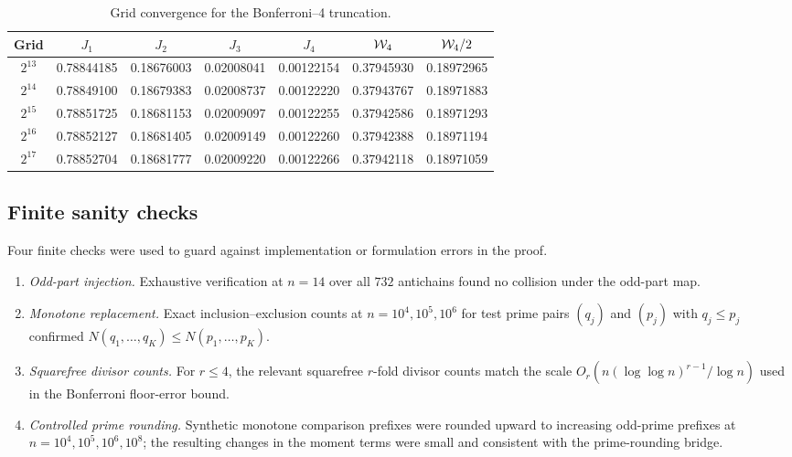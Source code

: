 \begin{table}[ht]
\centering
\small
\begin{tabular}{|c|c|c|c|c|c|c|}
\hline
Grid & $J_1$ & $J_2$ & $J_3$ & $J_4$ & $\mathcal{W}_4$ & $\mathcal{W}_4/2$ \\
\hline
$2^{13}$ & 0.78844185 & 0.18676003 & 0.02008041 & 0.00122154 & 0.37945930 & 0.18972965 \\
$2^{14}$ & 0.78849100 & 0.18679383 & 0.02008737 & 0.00122220 & 0.37943767 & 0.18971883 \\
$2^{15}$ & 0.78851725 & 0.18681153 & 0.02009097 & 0.00122255 & 0.37942586 & 0.18971293 \\
$2^{16}$ & 0.78852127 & 0.18681405 & 0.02009149 & 0.00122260 & 0.37942388 & 0.18971194 \\
$2^{17}$ & 0.78852704 & 0.18681777 & 0.02009220 & 0.00122266 & 0.37942118 & 0.18971059 \\
\hline
\end{tabular}
\caption{Grid convergence for the Bonferroni--4 truncation.}
\label{tab:grid-bonferroni}
\end{table}

\subsection{Finite sanity checks}

Four finite checks were used to guard against implementation or formulation
errors in the proof.

\begin{enumerate}
  \item \emph{Odd-part injection.}  Exhaustive verification at $n=14$ over all
  $732$ antichains found no collision under the odd-part map.
  \item \emph{Monotone replacement.}  Exact inclusion--exclusion counts at
  $n=10^4,10^5,10^6$ for test prime pairs $(q_j)$ and $(p_j)$ with
  $q_j\le p_j$ confirmed $N(q_1,\ldots,q_K)\le N(p_1,\ldots,p_K)$.
  \item \emph{Squarefree divisor counts.}  For $r\le4$, the relevant
  squarefree $r$-fold divisor counts match the scale
  $O_r(n(\log\log n)^{r-1}/\log n)$ used in the Bonferroni floor-error bound.
  \item \emph{Controlled prime rounding.}  Synthetic monotone comparison
  prefixes were rounded upward to increasing odd-prime prefixes at
  $n=10^4,10^5,10^6,10^8$; the resulting changes in the moment terms were
  small and consistent with the prime-rounding bridge.
\end{enumerate}

